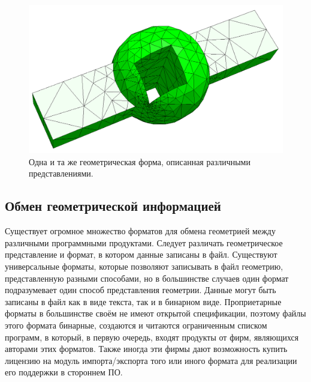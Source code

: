 \begin{figure}[H]
\hspace{0.01\textwidth}
\begin{minipage}[b]{0.495\textwidth}
\includegraphics[width=1.0\textwidth]{pictures/FEM_rough.png}
\end{minipage}
\caption{Одна и та же геометрическая форма, описанная различными представлениями.}
\label{fig:DiffGeoRepr}
\end{figure}

%                                                              

\subsection{Обмен геометрической информацией}\label{sec:secGeoFormats}


Существует огромное множество форматов для обмена геометрией между различными программными продуктами. Следует различать геометрическое представление и формат, в котором данные записаны в файл. Существуют универсальные форматы, которые позволяют записывать в файл геометрию, представленную разными способами, но в большинстве случаев один формат подразумевает один способ представления геометрии. Данные могут быть записаны в файл как в виде текста, так и в бинарном виде. Проприетарные форматы в большинстве своём не имеют открытой спецификации, поэтому файлы этого формата бинарные, создаются и читаются ограниченным списком программ, в который, в первую очередь, входят продукты от фирм, являющихся авторами этих форматов. Также иногда эти фирмы дают возможность купить лицензию на модуль импорта/экспорта того или иного формата для реализации его поддержки в стороннем ПО.

